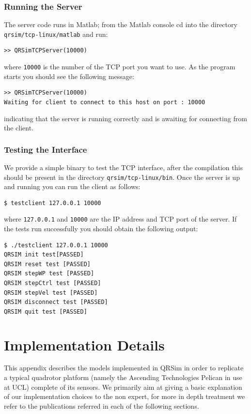 \documentclass[a4paper,11pt]{report}
\newcommand{\sname}{QRSim\xspace}
\begin{document}
\subsection{Running the Server}\label{run}
The server code runs in Matlab; from the Matlab console cd into the directory \texttt{qrsim/tcp-linux/matlab} and run:
\begin{verbatim}
>> QRSimTCPServer(10000)
\end{verbatim}
where \texttt{10000} is the number of the TCP port you want to use. As the program starts you should see the following message:
\begin{verbatim}
>> QRSimTCPServer(10000)
Waiting for client to connect to this host on port : 10000
\end{verbatim}
indicating that the server is running correctly and is awaiting for connecting from the client.

\subsection{Testing the Interface}

We provide a simple binary to test the TCP interface, after the compilation this should be present in the directory \texttt{qrsim/tcp-linux/bin}.
Once the server is up and running you can run the client as follows:
\begin{verbatim}
$ testclient 127.0.0.1 10000
\end{verbatim}
where \texttt{127.0.0.1} and \texttt{10000} are the IP address and TCP port of the server.
If the tests run successfully you should obtain the following output:
\begin{verbatim}
$ ./testclient 127.0.0.1 10000
QRSIM init test[PASSED]
QRSIM reset test [PASSED]
QRSIM stepWP test [PASSED]
QRSIM stepCtrl test [PASSED]
QRSIM stepVel test [PASSED]
QRSIM disconnect test [PASSED]
QRSIM quit test [PASSED]
\end{verbatim}



\appendix
\chapter{Implementation Details}

This appendix describes the models implemented in \sname in order to replicate a typical quadrotor platform (namely the Ascending Technologies Pelican \cite{asctec2011pelican} in use at UCL) complete of its sensors.
We primarily aim at giving a basic explanation of our implementation choices to the non expert, for more in depth treatment we refer to the publications referred in each of the following sections.
\end{document}
